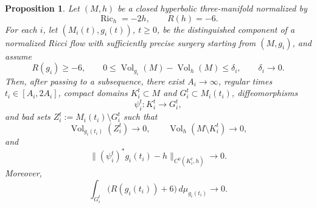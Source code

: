 \documentclass[10pt,a4paper]{amsart}
\newtheorem{proposition}{Proposition}
\begin{document}
\begin{proposition}
\label{prop:entropy-good-time-c0-hyperbolic-borel}
Let \((M,h)\) be a closed hyperbolic three-manifold normalized by
\[
        \operatorname{Ric}_h=-2h,
        \qquad
        R(h)=-6.
\]
For each \(i\), let \((M_i(t),g_i(t))\), \(t\geq0\), be the distinguished
component of a normalized Ricci flow with sufficiently precise surgery
starting from \((M,g_i)\), and assume
\[
        R(g_i)\geq-6,
        \qquad
        0\leq\operatorname{Vol}_{g_i}(M)-\operatorname{Vol}_h(M)
        \leq\delta_i,
        \qquad
        \delta_i\to0.
\]
Then, after passing to a subsequence, there exist \(A_i\to\infty\),
regular times
$ t_i\in[A_i,2A_i]$,
compact domains \(K_i^t\subset M\) and \(G_i^t\subset M_i(t_i)\),
diffeomorphisms
\[
        \psi_i^t:K_i^t\longrightarrow G_i^t,
\]
and bad sets \(Z_i^t:=M_i(t_i)\setminus G_i^t\) such that
\[
        \operatorname{Vol}_{g_i(t_i)}(Z_i^t)\to0,
        \qquad
        \operatorname{Vol}_h(M\setminus K_i^t)\to0,
\]
and
\[
        \|(\psi_i^t)^*g_i(t_i)-h\|_{C^0(K_i^t,h)}\to0.
\]
Moreover,
\[
        \int_{G_i^t}
        \bigl(R(g_i(t_i))+6\bigr)\,d\mu_{g_i(t_i)}
        \to0.
\]
\end{proposition}
\end{document}
